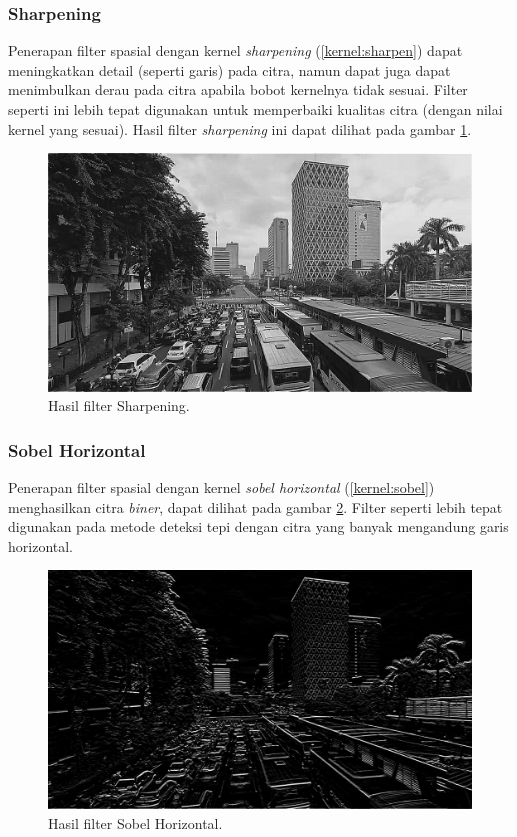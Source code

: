 \subsubsection{Sharpening}
Penerapan filter spasial dengan kernel \textit{sharpening} (\ref{kernel:sharpen}) dapat meningkatkan detail (seperti garis) pada citra, namun dapat juga dapat menimbulkan derau pada citra apabila bobot kernelnya tidak sesuai. Filter seperti ini lebih tepat digunakan untuk memperbaiki kualitas citra (dengan nilai kernel yang sesuai). Hasil filter \textit{sharpening} ini dapat dilihat pada gambar \ref{fig:output-sharpen}.
\begin{figure}
    \includegraphics[width=0.8\linewidth, center]{images/output-image/input1-sharpen.png}
    \caption{Hasil filter Sharpening.}
    \label{fig:output-sharpen}
\end{figure}

\subsubsection{Sobel Horizontal}
Penerapan filter spasial dengan kernel \textit{sobel horizontal} (\ref{kernel:sobel}) menghasilkan citra \textit{biner}, dapat dilihat pada gambar \ref{fig:output-sobelhor}. Filter seperti lebih tepat digunakan pada metode deteksi tepi dengan citra yang banyak mengandung garis horizontal.
\begin{figure}
    \includegraphics[width=0.8\linewidth, center]{images/output-image/input1-sobelhor.png}
    \caption{Hasil filter Sobel Horizontal.}
    \label{fig:output-sobelhor}
\end{figure}


